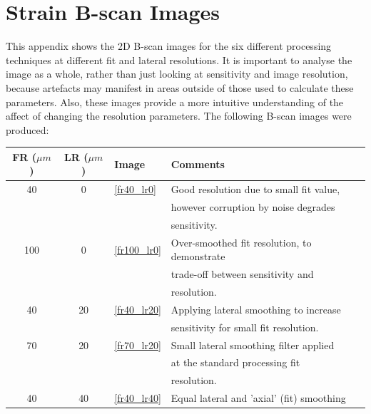 \chapter{Strain B-scan Images}\label{images}

This appendix shows the 2D B-scan images for the six different processing techniques at different fit and lateral resolutions. It is important to analyse the image as a whole, rather than just looking at sensitivity and image resolution, because artefacts may manifest in areas outside of those used to calculate these parameters. Also, these images provide a more intuitive understanding of the affect of changing the resolution parameters. The following B-scan images were produced:

\begin{table}[h!]
	\centering
	\begin{tabular}{|c|c||l|l|}
		\hline
		FR ($\mu m$) & LR ($\mu m$) & Image & Comments \\
		\hline
		\hline
		40 & 0 & \autoref{fr40_lr0} & Good resolution due to small fit value, \\
		& & & however corruption by noise degrades \\
		& & & sensitivity. \\
		\hline
		100 & 0 & \autoref{fr100_lr0} & Over-smoothed fit resolution, to demonstrate \\
		& & & trade-off between sensitivity and \\
		& & & resolution. \\
		\hline
		40 & 20 & \autoref{fr40_lr20} & Applying lateral smoothing to increase \\
		& & & sensitivity for small fit resolution. \\
		\hline
		70 & 20 & \autoref{fr70_lr20} & Small lateral smoothing filter applied \\
		& & & at the standard processing fit \\
		& & & resolution. \\
		\hline
		40 & 40 & \autoref{fr40_lr40} & Equal lateral and 'axial' (fit) smoothing\\
		\hline
	\end{tabular}
\end{table}


